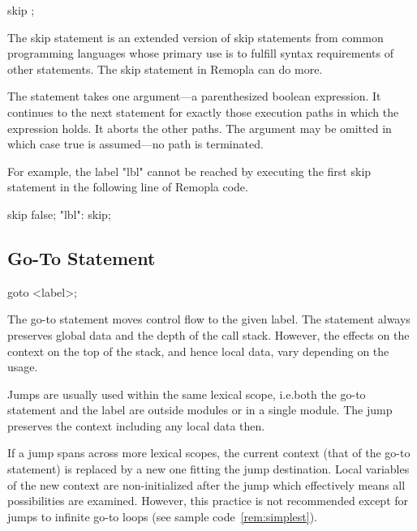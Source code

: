 \documentclass[a4paper,11pt,titlepage,english]{article}
\begin{document}
\begin{bnfgrammar}
 \is skip ; \\
\end{bnfgrammar}

The skip statement is an extended version of skip statements from common
programming languages whose primary use is to fulfill syntax
requirements of other statements. The skip statement in Remopla can do
more.

The statement takes one argument---a parenthesized boolean expression. It
continues to the next statement for exactly those execution
paths in which the expression holds. It aborts the other paths. The
argument may be omitted in which case true is assumed---no path is
terminated.

For example, the label "lbl" cannot be reached by executing the first skip
statement in the following line of Remopla code.
\begin{RemoplaSnippet}
    skip false; "lbl": skip;
\end{RemoplaSnippet}


\subsection{Go-To Statement\label{s:goto}}

\begin{bnfgrammar}
 \is goto <label>; \\
\end{bnfgrammar}

The go-to statement moves control flow to the given label. The statement
always preserves global data and the depth of the call stack. However, the
effects on the context on the top of the stack, and hence local data, vary
depending on the usage.

Jumps are usually used within the same lexical scope, i.e.\@ both the go-to
statement and the label are outside modules or in a single module. The jump
preserves the context including any local data then.

If a jump spans across more lexical scopes, the current context (that of
the go-to statement) is replaced by a new one fitting the jump destination.
Local variables of the new context are non-initialized after the jump which
effectively means all possibilities are examined. However, this practice is
not recommended except for jumps to infinite go-to loops
(see sample code~\ref{rem:simplest}).
\end{document}
